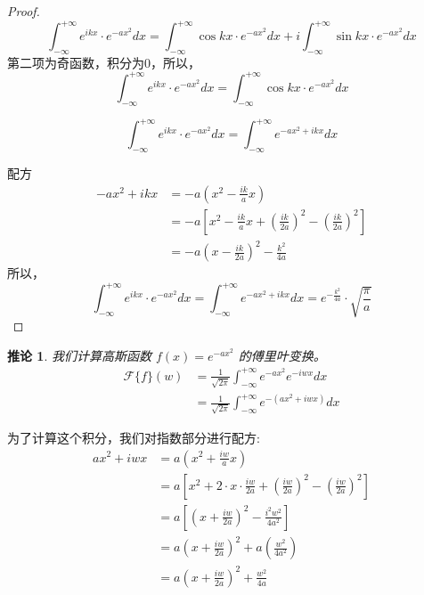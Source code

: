 \documentclass[12pt,a4paper]{article}
\numberwithin{subsection}{section}   %
\numberwithin{subsubsection}{subsection}
\theoremstyle{plain}
\newtheorem{corollary}[theorem]{推论}
\theoremstyle{definition}
\theoremstyle{remark}
\theoremstyle{remark}
\begin{document}
	\begin{proof}
		
		\begin{equation*}
			\int_{-\infty}^{+\infty} e^{ikx} \cdot e^{-a x^2} dx =\int_{-\infty}^{+\infty} \cos kx \cdot e^{-a x^2} dx+i\int_{-\infty}^{+\infty} \sin kx \cdot e^{-a x^2} dx
		\end{equation*}
		第二项为奇函数，积分为0，所以，
		\begin{equation*}
			\int_{-\infty}^{+\infty} e^{ikx} \cdot e^{-a x^2} dx =\int_{-\infty}^{+\infty} \cos kx \cdot e^{-a x^2} dx
		\end{equation*}
		
		\begin{equation*}
			\int_{-\infty}^{+\infty} e^{ikx} \cdot e^{-a x^2} dx = \int_{-\infty}^{+\infty} e^{-a x^2 + ikx} dx
		\end{equation*}
		
		配方
		\begin{equation*}
			\begin{split}
				-a x^2 + ikx &= -a \left( x^2 - \frac{ik}{a} x \right) \\
				&= -a \left[ x^2 - \frac{ik}{a} x + \left( \frac{ik}{2a} \right)^2 - \left( \frac{ik}{2a} \right)^2 \right] \\
				&= -a \left( x - \frac{ik}{2a} \right)^2 - \frac{k^2}{4a}
			\end{split}
		\end{equation*}
		所以，
		\begin{equation*}
			\int_{-\infty}^{+\infty} e^{ikx} \cdot e^{-a x^2} dx = \int_{-\infty}^{+\infty} e^{-a x^2 + ikx} dx	= e^{-\frac{k^2}{4a}} \cdot \sqrt{\frac{\pi}{a}}
		\end{equation*}
	\end{proof}
	
	\begin{corollary}
		我们计算高斯函数 $f(x) = e^{-ax^2}$ 的傅里叶变换。
		\begin{align*}
			\mathcal{F}\{f\}(w) &= \frac{1}{\sqrt{2\pi}} \int_{-\infty}^{+\infty} e^{-ax^2} e^{-iwx} dx \\
			&= \frac{1}{\sqrt{2\pi}} \int_{-\infty}^{+\infty} e^{-(ax^2 + iwx)} dx
		\end{align*}
	\end{corollary}
	
	
	为了计算这个积分，我们对指数部分进行配方:
	\begin{align*}
		ax^2 + iwx &= a\left(x^2 + \frac{iw}{a}x\right) \\
		&= a\left[ x^2 + 2 \cdot x \cdot \frac{iw}{2a} + \left(\frac{iw}{2a}\right)^2 - \left(\frac{iw}{2a}\right)^2 \right] \\
		&= a\left[ \left(x + \frac{iw}{2a}\right)^2 - \frac{i^2w^2}{4a^2} \right] \\
		&= a\left(x + \frac{iw}{2a}\right)^2 + a\left(\frac{w^2}{4a^2}\right) \\
		&= a\left(x + \frac{iw}{2a}\right)^2 + \frac{w^2}{4a}
	\end{align*}
	
\end{document}
